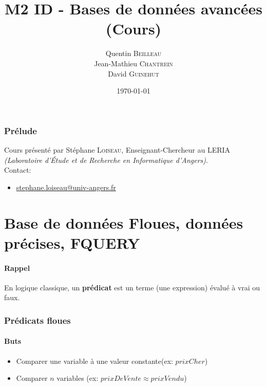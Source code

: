 \documentclass[a4paper,11pt]{article}
\title{M2 ID - Bases de données avancées \\ \normalsize (Cours)}
\author{Quentin \textsc{Beilleau} \\ Jean-Mathieu \textsc{Chantrein} \\ David \textsc{Guinehut}}
\date{\today}
\begin{document}
	\renewcommand{\headrulewidth}{0.001pt}
	
	\pagestyle{fancy}
	
	\maketitle

	\tableofcontents

\section*{Prélude}
Cours présenté par Stéphane \textsc{Loiseau}, Enseignant-Chercheur au LERIA \emph{(Laboratoire d’Étude et de Recherche en Informatique d'Angers)}.\\

Contact:
	\begin{itemize}
		\item[] \url{stephane.loiseau@univ-angers.fr} 
	\end{itemize}

\part{Base de données Floues, données précises, FQUERY}

\subsection*{Rappel}
En logique classique, un \textbf{prédicat} est un terme (une expression) évalué à vrai ou faux.

\section{Prédicats floues}

\subsection{Buts}
\begin{itemize}
\item Comparer une variable à une valeur constante(ex: $prixCher$)
\item Comparer $n$ variables (ex: $prixDeVente \approx prixVendu$)
\end{itemize}
\end{document}
